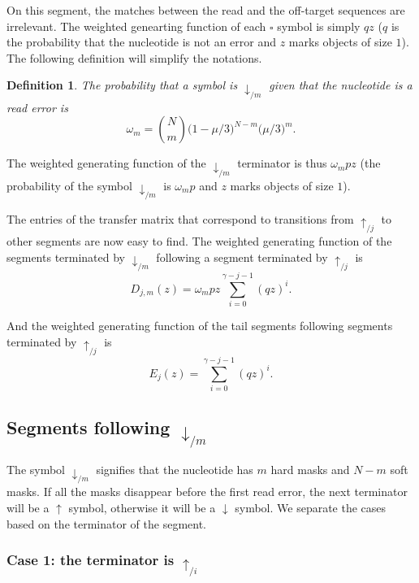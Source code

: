 \documentclass{article}
\newtheorem{definition}{Definition}
\begin{document}
On this segment, the matches between the read and the off-target sequences
are irrelevant. The weighted genearting function of each $\square$ symbol
is simply $qz$ ($q$ is the probability that the nucleotide is not an error
and $z$ marks objects of size $1$). The following definition will simplify
the notations.

\begin{definition}
The probability that a symbol is $\downarrow_{/m}$ given that the
nucleotide is a read error is
\begin{equation}
\label{eq:omega}
\omega_m = {N \choose m} \big(1 - \mu/3\big)^{N-m} \big(\mu/3\big)^m.
\end{equation}
\end{definition}

The weighted generating function of the $\downarrow_{/m}$ terminator is
thus $\omega_m pz$ (the probability of the symbol $\downarrow_{/m}$ is
$\omega_m p$ and $z$ marks objects of size $1$).

The entries of the transfer matrix that correspond to transitions from
$\uparrow_{/j}$ to other segments are now easy to find. The weighted
generating function of the segments terminated by $\downarrow_{/m}$
following a segment terminated by $\uparrow_{/j}$ is
\begin{equation}
\label{eq:D}
D_{j,m}(z) = \omega_m pz \sum_{i=0}^{\gamma-j-1} (qz)^i.
\end{equation}

And the weighted generating function of the tail segments following
segments terminated by $\uparrow_{/j}$ is
\begin{equation}
\label{eq:E}
E_j(z) = \sum_{i=0}^{\gamma-j-1} (qz)^i.
\end{equation}


\subsection{Segments following $\downarrow_{/m}$}

The symbol $\downarrow_{/m}$ signifies that the nucleotide has $m$ hard
masks and $N-m$ soft masks. If all the masks disappear before the first
read error, the next terminator will be a $\uparrow$ symbol, otherwise it
will be a $\downarrow$ symbol. We separate the cases based on the
terminator of the segment.

\subsubsection*{Case 1: the terminator is $\uparrow_{/i}$}
\end{document}
